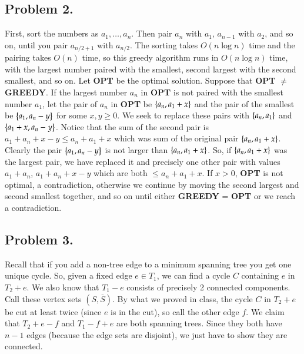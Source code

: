 \documentclass[12pt]{article}
\theoremstyle{definitionstyle}
\newcommand{\SET}[1]{\Set{\mskip-\medmuskip #1 \mskip-\medmuskip}}
\begin{document}
    \subsection*{Problem 2.}
    First, sort the numbers as $a_1, \ldots, a_n$. Then pair $a_n$ with $a_1$, $a_{n-1}$ with $a_2$, and so on, until you pair $a_{n/2+1}$ with $a_{n/2}$. The sorting takes $O(n \log n)$ time and the pairing takes $O(n)$ time, so this greedy algorithm runs in $O(n\log n)$ time, with the largest number paired with the smallest, second largest with the second smallest, and so on. Let \textbf{OPT} be the optimal solution. Suppose that \textbf{OPT} $\neq$ \textbf{GREEDY}. If the largest number $a_n$ in \textbf{OPT} is not paired with the smallest number $a_1$, let the pair of $a_n$ in \textbf{OPT} be $\SET{a_n, a_1+x}$ and the pair of the smallest be $\SET{a_1, a_n-y}$ for some $x,y \geq 0$. We seek to replace these pairs with $\SET{a_n, a_1}$ and $\SET{a_1+x, a_n-y}$. Notice that the sum of the second pair is $a_1+a_n+x-y \leq a_n+a_1+x$ which was sum of the original pair $\SET{a_n, a_1+x}$. Clearly the pair $\SET{a_1, a_n-y}$ is not larger than $\SET{a_n, a_1+x}$. So, if $\SET{a_n, a_1+x}$ was the largest pair, we have replaced it and precisely one other pair with values $a_1+a_n$, $a_1+a_n+x-y$ which are both $\leq a_n+a_1+x$. If $x > 0$, \textbf{OPT} is not optimal, a contradiction, otherwise we continue by moving the second largest and second smallest together, and so on until either \textbf{GREEDY} = \textbf{OPT} or we reach a contradiction.

    \subsection*{Problem 3.}
    Recall that if you add a non-tree edge to a minimum spanning tree you get one unique cycle. So, given a fixed edge $e \in T_1$, we can find a cycle $C$ containing $e$ in $T_2 + e$. We also know that $T_1 - e$ consists of precisely 2 connected components. Call these vertex sets $(S, \overline S)$. By what we proved in class, the cycle $C$ in $T_2 + e$ be cut at least twice (since $e$ is in the cut), so call the other edge $f$. We claim that $T_2 + e - f$ and $T_1 - f + e$ are both spanning trees. Since they both have $n-1$ edges (because the edge sets are disjoint), we just have to show they are connected. 
    
\end{document}
